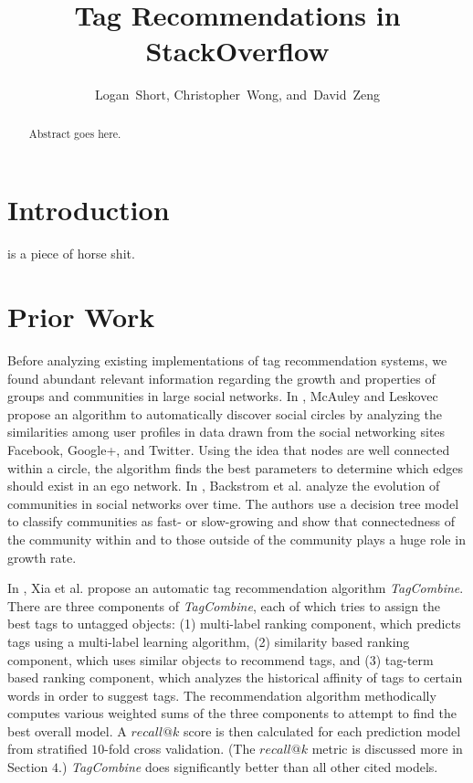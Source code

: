 \documentclass[10pt]{IEEEtran}
\begin{document}
\title{Tag Recommendations in StackOverflow}
\author{Logan~Short, Christopher~Wong, and~David~Zeng}%
\maketitle

\begin{abstract}
Abstract goes here.
\end{abstract}

\section{Introduction}

 is a piece of horse shit.

\section{Prior Work}

Before analyzing existing implementations of tag recommendation systems, we found abundant relevant information regarding the growth and properties of groups and communities in large social networks. In \cite{2}, McAuley and Leskovec propose an algorithm to automatically discover social circles by analyzing the similarities among user profiles in data drawn from the social networking sites Facebook, Google+, and Twitter. Using the idea that nodes are well connected within a circle, the algorithm finds the best parameters to determine which edges should exist in an ego network. In \cite{3}, Backstrom et al. analyze the evolution of communities in social networks over time. The authors use a decision tree model to classify communities as fast- or slow-growing and show that connectedness of the community within and to those outside of the community plays a huge role in growth rate.

In \cite{1}, Xia et al. propose an automatic tag recommendation algorithm \textit{TagCombine}. There are three components of \textit{TagCombine}, each of which tries to assign the best tags to untagged objects: (1) multi-label ranking component, which predicts tags using a multi-label learning algorithm, (2) similarity based ranking component, which uses similar objects to recommend tags, and (3) tag-term based ranking component, which analyzes the historical affinity of tags to certain words in order to suggest tags. The recommendation algorithm methodically computes various weighted sums of the three components to attempt to find the best overall model. A $recall@k$ score is then calculated for each prediction model from stratified $10$-fold cross validation. (The $recall@k$ metric is discussed more in Section $4$.) \textit{TagCombine} does significantly better than all other cited models.
\end{document}
